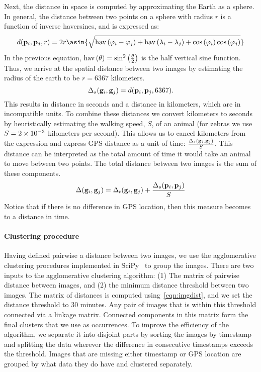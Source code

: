     Next, the distance in space is computed by approximating the Earth as a sphere.
    In general, the distance between two points on a sphere with radius $r$ is a function of inverse haversines,
      and is expressed as:
    \begin{equation}\label{eqn:geodistance}
        d(\gps_i, \gps_j, r) =
        2 r \asin{\sqrt{
            \haversine{\lat_i - \lat_j} +
            \haversine{\lon_i - \lon_j} +
            \cos\paren{\lat_i} \cos\paren{\lat_j}}}
    \end{equation}
    In the previous equation, $\mathbin{\operatorname{hav}}\left(\theta\right) = \sin^{2}\left(\frac{\theta}{2}\right)$ is the half vertical sine function.
    Thus, we arrive at the spatial distance between two images by estimating the radius of the earth to be
      $r=6367$ kilometers.
    \begin{equation}
        \Delta_s(\mathbf{g}_i, \mathbf{g}_j) = d(\mathbf{p}_i, \mathbf{p}_j, 6367).
    \end{equation}
    This results in distance in seconds and a distance in kilometers, which are in incompatible units.
    To combine these distances we convert kilometers to seconds by heuristically estimating the walking speed,
      $S$, of an animal (for zebras we use $S=2\times 10^{-3}$ kilometers per second).
    This allows us to cancel kilometers from the expression and express GPS distance as a unit of time:
    $\frac{\Delta_s(\mathbf{g}_i, \mathbf{g}_j)}{S}$.
    This distance can be interpreted as the total amount of time it would take an animal to move between two
      points.
    The total distance between two images is the sum of these components.
    \begin{equation}\label{eqn:imgdist}
        \Delta(\mathbf{g}_i, \mathbf{g}_j) = \Delta_t(\mathbf{g}_i, \mathbf{g}_j) + \frac{\Delta_s(\mathbf{p}_i, \mathbf{p}_j)}{S}
    \end{equation}
    Notice that if there is no difference in GPS location, then this measure
      becomes to a distance in time.

    \paragraph{Clustering procedure}
    Having defined pairwise a distance between two images, we use the agglomerative clustering procedures
      implemented in SciPy~\cite{eric_jones_scipy_2001} to group the images.
    There are two inputs to the agglomerative clustering algorithm:
    (1) The matrix of pairwise distance between images, and
    (2) the minimum distance threshold between two images.
    The matrix of distances is computed using~\cref{eqn:imgdist}, and we set the distance threshold to $30$
      minutes.
    Any pair of images that is within this threshold connected via a linkage matrix.
    Connected components in this matrix form the final clusters that we use as occurrences{}.
    To improve the efficiency of the algorithm, we separate it into disjoint parts by sorting the images by
      timestamp and splitting the data wherever the difference in consecutive timestamps exceeds the threshold.
    Images that are missing either timestamp or GPS location are grouped by what data they do have and clustered
      separately.

